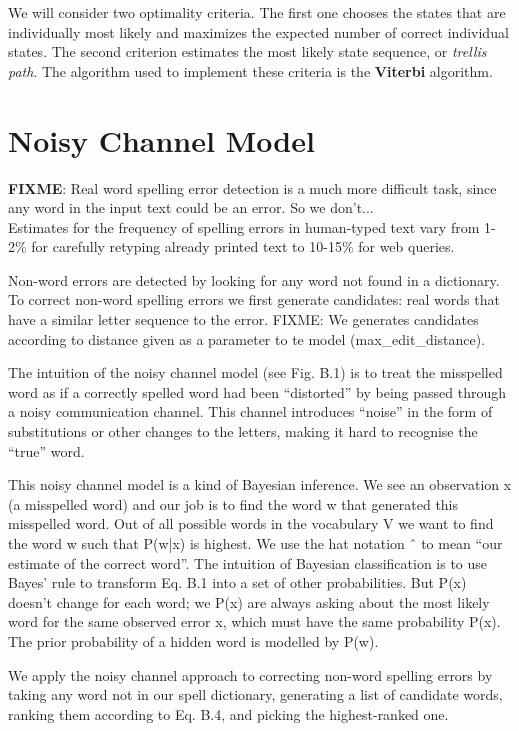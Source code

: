 We will consider two optimality criteria. The first one chooses the states that are individually most likely and maximizes the 
expected number of correct individual states. The second criterion estimates the most likely state sequence, or 
\textit{trellis path}. The algorithm used to implement these criteria is the \textbf{Viterbi} algorithm. %

\section{Noisy Channel Model}

\textbf{FIXME}: Real word spelling error detection is a much more difficult task, since any word in the input text could be 
an error. So we don’t...\\


Estimates for the frequency of spelling errors in human-typed text vary from 1-2\% for carefully retyping already printed 
text to 10-15\% for web queries.

Non-word errors are detected by looking for any word not found in a dictionary. To correct non-word spelling errors we 
first generate candidates: real words that have a similar letter sequence to the error. FIXME: We generates candidates 
according to distance given as a parameter to te model (max\_edit\_distance). 

The intuition of the noisy channel model (see Fig. B.1) is to treat the misspelled word as if a correctly spelled word had 
been “distorted” by being passed through a noisy communication channel. 
This channel introduces “noise” in the form of substitutions or other changes to the letters, making it hard to recognise 
the “true” word. 

This noisy channel model is a kind of Bayesian inference. We see an observation x (a misspelled word) and our job is to 
find the word w that generated this misspelled word.
Out of all possible words in the vocabulary V we want to find the word w such that P(w|x) is highest. We use the hat 
notation ˆ to mean “our estimate of the correct word”.
The intuition of Bayesian classification is to use Bayes’ rule to transform Eq. B.1 into a set of other probabilities.
But P(x) doesn’t change for each word; we P(x)
are always asking about the most likely word for the same observed error x, which must have the same probability P(x).
The prior probability of a hidden word is modelled by P(w). 

We apply the noisy channel approach to correcting non-word spelling errors by taking any word not in our spell 
dictionary, generating a list of candidate words, ranking them according to Eq. B.4, and picking the highest-ranked one.

